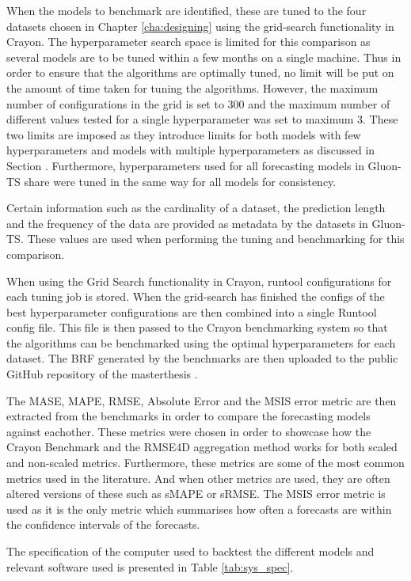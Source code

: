 When the models to benchmark are identified, these are tuned to the four datasets chosen in Chapter \ref{cha:designing} using the grid-search functionality in Crayon. The hyperparameter search space is limited for this comparison as several models are to be tuned within a few months on a single machine. Thus in order to ensure that the algorithms are optimally tuned, no limit will be put on the amount of time taken for tuning the algorithms. However, the maximum number of configurations in the grid is set to 300 and the maximum number of different values tested for a single hyperparameter was set to maximum 3. These two limits are imposed as they introduce limits for both models with few hyperparameters and models with multiple hyperparameters as discussed in Section \cite{dockerhub_arangatang}. Furthermore, hyperparameters used for all forecasting models in Gluon-TS share were tuned in the same way for all models for consistency.

Certain information such as the cardinality of a dataset, the prediction length and the frequency of the data are provided as metadata by the datasets in Gluon-TS. These values are used when performing the tuning and benchmarking for this comparison.

When using the Grid Search functionality in Crayon, runtool configurations for each tuning job is stored. When the grid-search has finished the configs of the best hyperparameter configurations are then combined into a single Runtool config file. This file is then passed to the Crayon benchmarking system so that the algorithms can be benchmarked using the optimal hyperparameters for each dataset. The BRF generated by the benchmarks are then uploaded to the public GitHub repository of the masterthesis \cite{masterthesis_github}.

The MASE, MAPE, RMSE, Absolute Error and the MSIS error metric are then extracted from the benchmarks in order to compare the forecasting models against eachother. These metrics were chosen in order to showcase how the Crayon Benchmark and the RMSE4D aggregation method works for both scaled and non-scaled metrics. Furthermore, these metrics are some of the most common metrics used in the literature. And when other metrics are used, they are often altered versions of these such as sMAPE or sRMSE. The MSIS error metric is used as it is the only metric which summarises how often a forecasts are within the confidence intervals of the forecasts.

The specification of the computer used to backtest the different models and relevant software used is presented in Table \ref{tab:sys_spec}.


